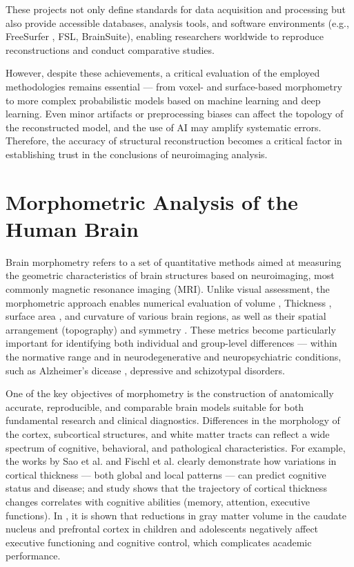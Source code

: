 \documentclass[default]{subfiles}
\begin{document}
These projects not only define standards for data acquisition and processing but also provide accessible databases,
analysis tools, and software environments (e.g., FreeSurfer \cite{caser_2024}, FSL, BrainSuite), enabling researchers worldwide to
reproduce reconstructions and conduct comparative studies.

However, despite these achievements, a critical evaluation of the employed methodologies remains essential — from
voxel- and surface-based morphometry to more complex probabilistic models based on machine learning and deep learning.
Even minor artifacts or preprocessing biases can affect the topology of the reconstructed model, and the use of AI may
amplify systematic errors. Therefore, the accuracy of structural reconstruction becomes a critical factor in
establishing trust in the conclusions of neuroimaging analysis.

\section{Morphometric Analysis of the Human Brain}

Brain morphometry refers to a set of quantitative methods aimed at measuring the geometric characteristics of brain
structures based on neuroimaging, most commonly magnetic resonance imaging (MRI). Unlike visual assessment, the
morphometric approach enables numerical evaluation of volume \cite{upadhyay_2014, fischl_2012, wang_2019, makris_2006},
Thickness \cite{upadhyay_2014, fischl_2000, fischl_2012, wang_2019, makris_2006}, surface area
\cite{desikan_2006, fischl_2012, fischl_2004, wang_2019, makris_2006}, and curvature
\cite{fischl_2012, fischl_2000, wang_2019, makris_2006} of various brain regions, as well as their spatial arrangement
(topography) \cite{desikan_2006, fischl_2008, fischl_1999, wang_2019} and symmetry
\cite{desikan_2006, greve_2013, fischl_2004, wang_2019}. These metrics \cite{klein_2017} become particularly
important for identifying both individual and group-level differences — within the normative range and in
neurodegenerative and neuropsychiatric conditions, such as Alzheimer's dicease \cite{he_2024}, depressive
\cite{van_2013} and schizotypal disorders.

One of the key objectives of morphometry is the construction of anatomically accurate, reproducible, and comparable
brain models suitable for both fundamental research and clinical diagnostics. Differences in the morphology of the
cortex, subcortical structures, and white matter tracts can reflect a wide spectrum of cognitive, behavioral, and
pathological characteristics. For example, the works by Sao et al. \cite{cao_2023} and Fischl et al. \cite{fischl_2000}
clearly demonstrate how variations in cortical thickness — both global and local patterns — can predict cognitive
status and disease; and study \cite{shaw_2006} shows that the trajectory of cortical thickness changes correlates with
cognitive abilities (memory, attention, executive functions). In \cite{jagger_2018}, it is shown that reductions in
gray matter volume in the caudate nucleus and prefrontal cortex in children and adolescents negatively affect executive
functioning and cognitive control, which complicates academic performance.
\end{document}
